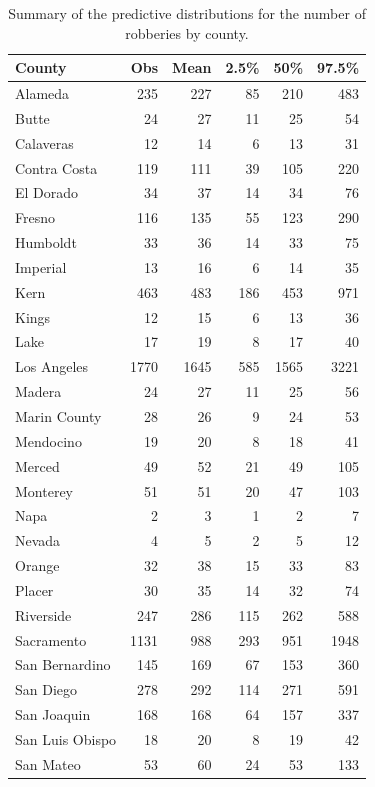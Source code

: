 \documentclass{asaproc}
\begin{document}
\begin{table}[p!]
\caption{\enspace Summary of the predictive distributions for the number of robberies by county.}
\begin{tabular}{lrrrrr}
\\ [-5pt]
County & Obs & Mean & 2.5\% & 50\% & 97.5\% \\ 
  \hline
Alameda & 235 & 227 & 85 & 210 & 483 \\ 
  Butte & 24 & 27 & 11 & 25 & 54 \\ 
  Calaveras & 12 & 14 & 6 & 13 & 31 \\ 
  Contra Costa & 119 & 111 & 39 & 105 & 220 \\ 
  El Dorado & 34 & 37 & 14 & 34 & 76 \\ 
  Fresno & 116 & 135 & 55 & 123 & 290 \\ 
  Humboldt & 33 & 36 & 14 & 33 & 75 \\ 
  Imperial & 13 & 16 & 6 & 14 & 35 \\ 
  Kern & 463 & 483 & 186 & 453 & 971 \\ 
  Kings & 12 & 15 & 6 & 13 & 36 \\ 
  Lake & 17 & 19 & 8 & 17 & 40 \\ 
  Los Angeles & 1770 & 1645 & 585 & 1565 & 3221 \\ 
  Madera & 24 & 27 & 11 & 25 & 56 \\ 
  Marin County & 28 & 26 & 9 & 24 & 53 \\ 
  Mendocino & 19 & 20 & 8 & 18 & 41 \\ 
  Merced & 49 & 52 & 21 & 49 & 105 \\ 
  Monterey & 51 & 51 & 20 & 47 & 103 \\ 
  Napa & 2 & 3 & 1 & 2 & 7 \\ 
  Nevada & 4 & 5 & 2 & 5 & 12 \\ 
  Orange & 32 & 38 & 15 & 33 & 83 \\ 
  Placer & 30 & 35 & 14 & 32 & 74 \\ 
  Riverside & 247 & 286 & 115 & 262 & 588 \\ 
  Sacramento & 1131 & 988 & 293 & 951 & 1948 \\ 
  San Bernardino & 145 & 169 & 67 & 153 & 360 \\ 
  San Diego & 278 & 292 & 114 & 271 & 591 \\ 
  San Joaquin & 168 & 168 & 64 & 157 & 337 \\ 
  San Luis Obispo & 18 & 20 & 8 & 19 & 42 \\ 
  San Mateo & 53 & 60 & 24 & 53 & 133 \\ 

\end{tabular}
\end{table}
\end{document}
